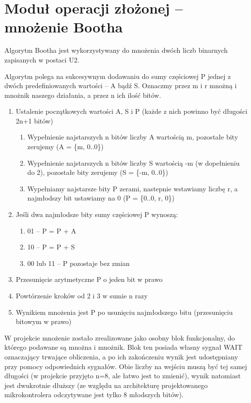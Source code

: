 \documentclass[a4paper,12pt]{report}
\begin{document}
\section{Moduł operacji złożonej -- mnożenie Bootha}

Algorytm Bootha jest wykorzystywany do mnożenia dwóch liczb binarnych zapisanych w postaci U2.

Algorytm polega na sukcesywnym dodawaniu do sumy częściowej P jednej z dwóch predefiniowanych wartości -- A bądź S. Oznaczmy przez m i r mnożną i mnożnik naszego działania, a przez n ich ilość bitów.

\begin{enumerate}
  \item Ustalenie początkowych wartości A, S i P (każde z nich powinno być długości 2n+1 bitów)
  \begin{enumerate}
    \item Wypełnienie najstarszych n bitów liczby A wartością m, pozostałe bity zerujemy (A = \{m, 0..0\})
    \item Wypełnienie najstarszych n bitów liczby S wartością -m (w dopełnieniu do 2), pozostałe bity zerujemy (S = \{-m, 0..0\})
    \item Wypełniamy najstarsze bity P zerami, nastepnie wstawiamy liczbę r, a najmłodszy bit ustawiamy na 0 (P = \{0..0, r, 0\})
  \end{enumerate}
  \item Jeśli dwa najmłodsze bity sumy częściowej P wynoszą:
  \begin{enumerate}
    \item 01 -- P = P + A
    \item 10 -- P = P + S
    \item 00 lub 11 -- P pozostaje bez zmian
  \end{enumerate}
  \item Przesunięcie arytmetyczne P o jeden bit w prawo
  \item Powtórzenie kroków od 2 i 3 w sumie n razy
  \item Wynikiem mnożenia jest P po usunięciu najmłodszego bitu (przesunięciu bitowym w prawo)
\end{enumerate}

W projekcie mnożenie zostało zrealizowane jako osobny blok funkcjonalny, do którego podawane są mnożna i mnożnik. Blok ten posiada własny sygnał WAIT oznaczający trwające obliczenia, a po ich zakończeniu wynik jest udostępniany przy pomocy odpowiednich sygnałów. Obie liczby na wejściu muszą być tej samej długości (w projekcie przyjęto n=8, ale łatwo jest to zmienić), wynik natomiast jest dwukrotnie dłuższy (ze względu na architekturę projektowanego mikrokontrolera odczytywane jest tylko 8 młodszych bitów).
\end{document}
